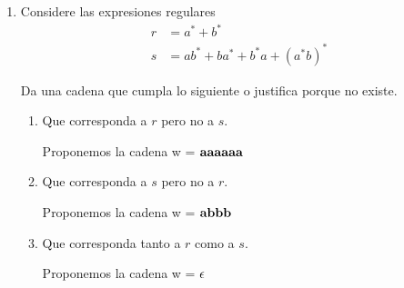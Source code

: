 \documentclass{article}
\begin{document}
\begin{enumerate}
{        }
        \item {
            Considere las expresiones regulares
            \begin{align*}
                r &= a^* + b^* \\
                s &= ab^* + ba^* + b^*a + (a^*b)^*
            \end{align*}
            
            Da una cadena que cumpla lo siguiente o justifica porque no existe.
            \begin{enumerate}
                \item {
                    Que corresponda a $r$ pero no a $s$.
                    
                    Proponemos la cadena w = $\bf{aaaaaa}$\\
                }
                \item {
                    Que corresponda a $s$ pero no a $r$.
                    
                   Proponemos la cadena w = $\bf{abbb}$\\
                   
                }
                \item {
                    Que corresponda tanto a $r$ como a $s$.
                    
                    Proponemos la cadena w = $\bf{\epsilon}$
                }
            \end{enumerate}
        }
    \end{enumerate}
\end{document}
